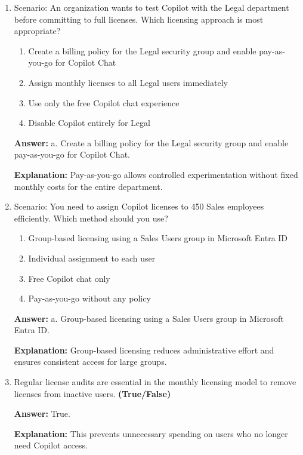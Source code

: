 \documentclass[10pt]{article}
\begin{document}
\begin{enumerate}[leftmargin=*]
\textbf{Explanation:} This helps prevent unexpected cost spikes by setting limits such as 80%

\item Scenario: An organization wants to test Copilot with the Legal department before committing to full licenses. Which licensing approach is most appropriate?
\begin{enumerate}[label=\alph*., leftmargin=1.5em]
\item Create a billing policy for the Legal security group and enable pay-as-you-go for Copilot Chat
\item Assign monthly licenses to all Legal users immediately
\item Use only the free Copilot chat experience
\item Disable Copilot entirely for Legal
\end{enumerate}
\textbf{Answer:} a. Create a billing policy for the Legal security group and enable pay-as-you-go for Copilot Chat.

\textbf{Explanation:} Pay-as-you-go allows controlled experimentation without fixed monthly costs for the entire department.

\item Scenario: You need to assign Copilot licenses to 450 Sales employees efficiently. Which method should you use?
\begin{enumerate}[label=\alph*., leftmargin=1.5em]
\item Group-based licensing using a Sales Users group in Microsoft Entra ID
\item Individual assignment to each user
\item Free Copilot chat only
\item Pay-as-you-go without any policy
\end{enumerate}
\textbf{Answer:} a. Group-based licensing using a Sales Users group in Microsoft Entra ID.

\textbf{Explanation:} Group-based licensing reduces administrative effort and ensures consistent access for large groups.

\item Regular license audits are essential in the monthly licensing model to remove licenses from inactive users. \textbf{(True/False)}

\textbf{Answer:} True.

\textbf{Explanation:} This prevents unnecessary spending on users who no longer need Copilot access.

\end{enumerate}
\clearpage
\end{document}
